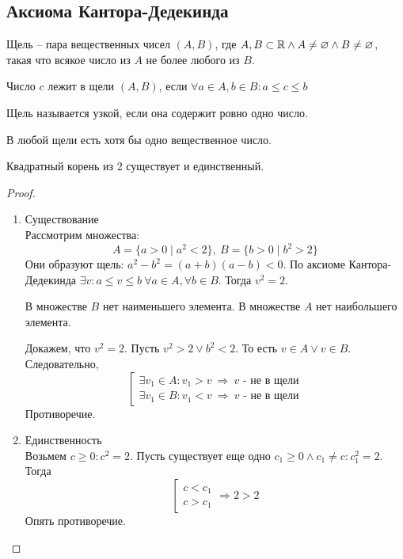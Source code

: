 \documentclass[12pt]{report}
\begin{document}
\subsection{Аксиома Кантора-Дедекинда}\label{ques_4}
\begin{defn}
    Щель -- пара вещественных чисел $(A, B)$, где  $A, B \subset \mathbb{R} \wedge A \ne \varnothing \wedge B \ne \varnothing$, такая что всякое число из $A$ не более любого из $B$.
\end{defn}
\begin{defn}
    Число $c$ лежит в щели $(A, B) $, если $\forall a \in A, b \in B: a \le c \le b$
\end{defn}
\begin{defn}
    Щель называется узкой, если она содержит ровно одно число.
\end{defn}
\begin{aks}
    В любой щели есть хотя бы одно вещественное число.
\end{aks}
\begin{st}
    Квадратный корень из 2 существует и единственный.
\end{st}
\begin{proof}
    $ $
    \begin{enumerate}
        \item Существование \\
	    Рассмотрим множества:
	    $$A = \{a > 0 \mid a^2 < 2\}, ~ B = \{b > 0\mid b^2 > 2\}$$
	    Они образуют щель: $a^2 - b^2 = (a + b)(a - b) < 0$. По аксиоме Кантора-Дедекинда $\exists v: a \le v \le b ~\forall a \in A, \forall b \in B$. Тогда $v^2 = 2$.
	    \begin{lm}
	        В множестве $ B$ нет наименьшего элемента.
	        В множестве $ A$ нет наибольшего элемента.
	    \end{lm}
	    Докажем, что $v^2 = 2$. Пусть $v^2 > 2 \vee b^2<2$. То есть $v \in A \vee v \in B$. Следовательно, \[
	    \left [ 
	    \begin{array}{l}
	    \exists v_1 \in A : v_1 > v ~ \Rightarrow ~ v \mbox{ - не в щели}\\ 
	    \exists v_1 \in B : v_1 < v ~ \Rightarrow ~ v \mbox{ - не в щели}
	    \end{array}
	    \right 
	    .\] 
Противоречие.
	\item Единственность \\
	    Возьмем $c \ge 0: c^2 = 2$. Пусть существует еще одно $c_1 \ge 0 \wedge c_1 \ne c: c_1^2 = 2$. Тогда \[
	    \left [ 
	    \begin{array}{c}
	   c<c_1 \\
	   c>c_1
	    \end{array}
	    \right . \Rightarrow 2 > 2
	\] 
	    Опять противоречие.
    \end{enumerate}
\end{proof}
\end{document}
